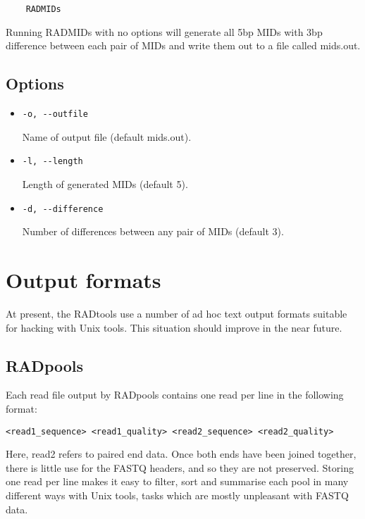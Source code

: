 \documentclass[a4paper]{article}
\begin{document}
\begin{verbatim}
    RADMIDs
\end{verbatim}

Running RADMIDs with no options will generate all 5bp MIDs with 3bp difference between each pair of MIDs and write them out to a file called mids.out.

\subsection{Options}

\begin{itemize}
    \item \verb|-o, --outfile|
    
    Name of output file (default mids.out).
    
    \item \verb|-l, --length|
    
    Length of generated MIDs (default 5).
    
    \item \verb|-d, --difference|
    
    Number of differences between any pair of MIDs (default 3).
\end{itemize}


\section{Output formats}

At present, the RADtools use a number of ad hoc text output formats suitable for hacking with Unix tools. This situation should improve in the near future.

\subsection{RADpools}

Each read file output by RADpools contains one read per line in the following format:

\begin{verbatim}
<read1_sequence> <read1_quality> <read2_sequence> <read2_quality>
\end{verbatim}

Here, read2 refers to paired end data. Once both ends have been joined together, there is little use for the FASTQ headers, and so they are not preserved. Storing one read per line makes it easy to filter, sort and summarise each pool in many different ways with Unix tools, tasks which are mostly unpleasant with FASTQ data.
\end{document}
